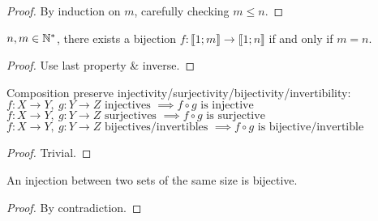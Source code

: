 \begin{proof}
	By induction on $m$, carefully checking $m \leq n$.
\end{proof}
\begin{property}
	$n,m \in \mathbb{N}^*$, there exists a bijection $f:\llbracket 1;m \rrbracket \rightarrow \llbracket 1;n \rrbracket$ if and only if $m=n$.
\end{property}
\begin{proof}
	Use last property \& inverse.
\end{proof}
\begin{property}[Compositions]
	Composition preserve injectivity/surjectivity/bijectivity/invertibility:
	$f: X \to Y, \ g: Y \to Z \text{ injectives } \implies f \circ g \text{ is injective}$\\
	$f: X \to Y, \ g: Y \to Z \text{ surjectives } \implies f \circ g \text{ is surjective}$\\
	$f: X \to Y, \ g: Y \to Z \text{ bijectives/invertibles } \implies f \circ g \text{ is bijective/invertible}$
\end{property}
\begin{proof}
	Trivial.
\end{proof}
\begin{property}
	An injection between two sets of the same size is bijective.
\end{property}
\begin{proof}
	By contradiction.
\end{proof}

